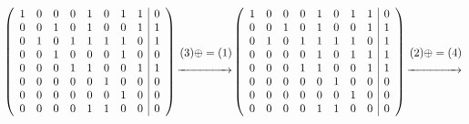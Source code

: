 \documentclass[a4paper,10pt]{article} %
\begin{document}
\begin{multline*}
		\left(
		\begin{array}{cccccccc|c}
		1 & 0 & 0 & 0 & 1 & 0 & 1 & 1 & 0 \\
		0 & 0 & 1 & 0 & 1 & 0 & 0 & 1 & 1 \\
		0 & 1 & 0 & 1 & 1 & 1 & 1 & 0 & 1 \\
		0 & 0 & 1 & 0 & 0 & 0 & 1 & 0 & 0 \\
		0 & 0 & 0 & 1 & 1 & 0 & 0 & 1 & 1 \\
		0 & 0 & 0 & 0 & 0 & 1 & 0 & 0 & 0 \\
		0 & 0 & 0 & 0 & 0 & 0 & 1 & 0 & 0 \\
		0 & 0 & 0 & 0 & 1 & 1 & 0 & 0 & 0 \\
		\end{array}
		\right)
		\begin{align}
		(3) \oplus= (1)\\
		\xrightarrow{\hspace*{1.5cm}}
		\end{align}
		\left(
		\begin{array}{cccccccc|c}
		1 & 0 & 0 & 0 & 1 & 0 & 1 & 1 & 0 \\
		0 & 0 & 1 & 0 & 1 & 0 & 0 & 1 & 1 \\
		0 & 1 & 0 & 1 & 1 & 1 & 1 & 0 & 1 \\
		0 & 0 & 0 & 0 & 1 & 0 & 1 & 1 & 1 \\
		0 & 0 & 0 & 1 & 1 & 0 & 0 & 1 & 1 \\
		0 & 0 & 0 & 0 & 0 & 1 & 0 & 0 & 0 \\
		0 & 0 & 0 & 0 & 0 & 0 & 1 & 0 & 0 \\
		0 & 0 & 0 & 0 & 1 & 1 & 0 & 0 & 0 \\
		\end{array}
		\right)
		\begin{align}
		(2) \oplus= (4)\\
		\xrightarrow{\hspace*{1.5cm}}
		\end{align}\\
\end{multline*}
\end{document}
